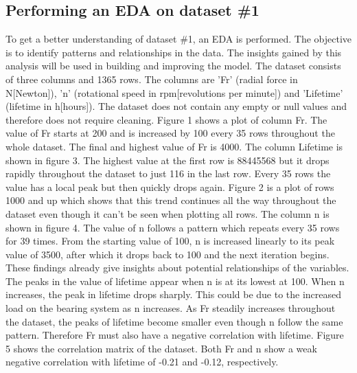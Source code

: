 \documentclass[letterpaper,10pt]{article}
\begin{document}
	\subsection{Performing an EDA on dataset \#1}
	To get a better understanding of dataset \#1, an EDA is performed. The objective is to identify patterns and relationships in the data. The insights gained by this analysis will be used in building and improving the model.
	\newline The dataset consists of three columns and 1365 rows. The columns are 'Fr' (radial force in N[Newton]), 'n' (rotational speed in rpm[revolutions per minute]) and 'Lifetime' (lifetime in h[hours]). The dataset does not contain any empty or null values and therefore does not require cleaning.
	\newline Figure 1 shows a plot of column Fr. The value of Fr starts at 200 and is increased by 100 every 35 rows throughout the whole dataset. The final and highest value of Fr is 4000. 
	\newline The column Lifetime is shown in figure 3. The highest value at the first row is 88445568 but it drops rapidly throughout the dataset to just 116 in the last row. Every 35 rows the value has a local peak but then quickly drops again. Figure 2 is a plot of rows 1000 and up which shows that this trend continues all the way throughout the dataset even though it can't be seen when plotting all rows. 
	\newline The column n is shown in figure 4. The value of n follows a pattern which repeats every 35 rows for 39 times. From the starting value of 100, n is  increased linearly to its peak value of 3500, after which it drops back to 100 and the next iteration begins. 
	\newline These findings already give insights about potential relationships of the variables. The peaks in the value of lifetime appear when n is at its lowest at 100. When n increases, the peak in lifetime drops sharply. This could be due to the increased load on the bearing system as n increases. As Fr steadily increases throughout the dataset, the peaks of lifetime become smaller even though n follow the same pattern. Therefore Fr must also have a negative correlation with lifetime.
	\newline Figure 5 shows the correlation matrix of the dataset. Both Fr and n show a weak negative correlation with lifetime of -0.21 and -0.12, respectively. 
	
	
	
	
	
\end{document}
